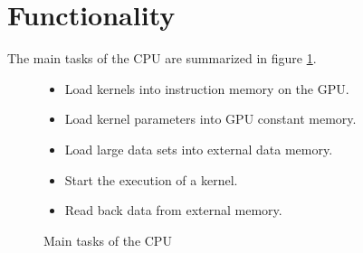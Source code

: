 \documentclass[../main/report.tex]{subfiles}
\begin{document}
\section{Functionality}

The main tasks of the CPU are summarized in figure \ref{fig:cpu_features}.

\begin{figure}[H]
    \begin{itemize}
      \item Load kernels into instruction memory on the GPU.
      \item Load kernel parameters into GPU constant memory.
      \item Load large data sets into external data memory.
      \item Start the execution of a kernel.
      \item Read back data from external memory.
    \end{itemize}
    \caption{Main tasks of the CPU}
    \label{fig:cpu_features}
\end{figure}
\end{document}
